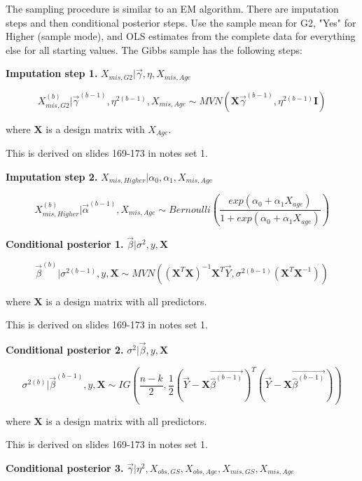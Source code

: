 \documentclass[11pt]{article}
\begin{document}
The sampling procedure is similar to an EM algorithm. There are imputation steps and then conditional posterior steps. Use the sample mean for G2, "Yes" for Higher (sample mode), and OLS estimates from the complete data for everything else for all starting values. The Gibbs sample has the following steps:

\vspace{0.25in}

\textbf{Imputation step 1.} $X_{mis, G2}|\vec\gamma, \eta, X_{mis, Age}$

$$X_{mis, G2}^{(b)}|\vec\gamma^{(b - 1)}, \eta^{2(b - 1)}, X_{mis, Age} \sim MVN(\mathbf{X}\vec{\gamma}^{(b - 1)}, \eta^{2(b - 1)}\mathbf{I})$$

where $\mathbf{X}$ is a design matrix with $X_{Age}$.

This is derived on slides 169-173 in notes set 1.

\vspace{0.25in}

\textbf{Imputation step 2.} $X_{mis, Higher}|\alpha_0, \alpha_1, X_{mis, Age}$

$$X_{mis, Higher}^{(b)}|\vec\alpha^{(b - 1)}, X_{mis, Age} \sim Bernoulli\left(\frac{exp(\alpha_0 + \alpha_1X_{age})}{1 + exp(\alpha_0 + \alpha_1X_{age})}\right)$$

\textbf{Conditional posterior 1.} $\vec\beta | \sigma^2, y, \mathbf{X}$

$$\vec\beta^{(b)} | \sigma^{2(b - 1)}, y, \mathbf{X} \sim MVN((\mathbf{X}^T\mathbf{X})^{-1}\mathbf{X}^T\vec{Y}, \sigma^{2(b - 1)}(\mathbf{X}^T\mathbf{X}^{-1}))$$

where $\mathbf{X}$ is a design matrix with all predictors.

This is derived on slides 169-173 in notes set 1.

\vspace{0.25in}

\textbf{Conditional posterior 2.} $\sigma^2 | \vec\beta, y, \mathbf{X}$

$$\sigma^{2(b)} | \vec\beta^{(b - 1)}, y, \mathbf{X} \sim IG\left(\frac{n - k}{2}, \frac{1}{2}(\vec{Y} - \mathbf{X}\vec{\hat\beta^{(b - 1)}})^T(\vec{Y} - \mathbf{X}\vec{\hat\beta^{(b - 1)}})\right)$$

where $\mathbf{X}$ is a design matrix with all predictors.

This is derived on slides 169-173 in notes set 1.

\vspace{0.25in}

\textbf{Conditional posterior 3.} $\vec{\gamma}|\eta^2, X_{obs, GS}, X_{obs, Age}, X_{mis, GS}, X_{mis, Age}$
\end{document}
